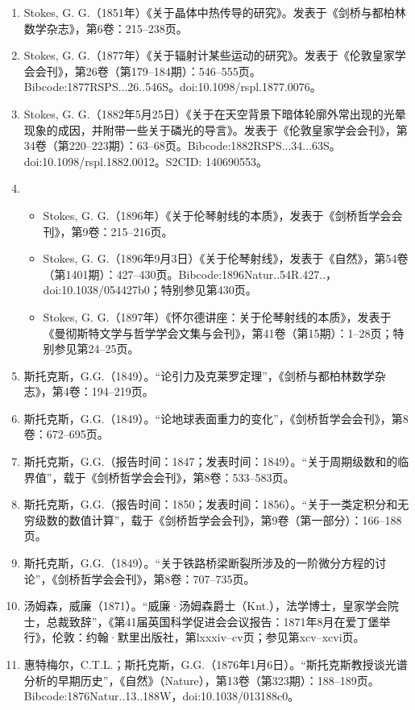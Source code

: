 \begin{enumerate}
\item Stokes, G. G.（1851年）《关于晶体中热传导的研究》。发表于《剑桥与都柏林数学杂志》，第6卷：215–238页。
\item Stokes, G. G.（1877年）《关于辐射计某些运动的研究》。发表于《伦敦皇家学会会刊》，第26卷（第179–184期）：546–555页。Bibcode:1877RSPS...26..546S。doi:10.1098/rspl.1877.0076。
\item Stokes, G. G.（1882年5月25日）《关于在天空背景下暗体轮廓外常出现的光晕现象的成因，并附带一些关于磷光的导言》。发表于《伦敦皇家学会会刊》，第34卷（第220–223期）：63–68页。Bibcode:1882RSPS...34...63S。doi:10.1098/rspl.1882.0012。S2CID: 140690553。
\item 
\begin{itemize}
\item Stokes, G. G.（1896年）《关于伦琴射线的本质》，发表于《剑桥哲学会会刊》，第9卷：215–216页。
\item Stokes, G. G.（1896年9月3日）《关于伦琴射线》，发表于《自然》，第54卷（第1401期）：427–430页。Bibcode:1896Natur..54R.427..，doi:10.1038/054427b0；特别参见第430页。
\item Stokes, G. G.（1897年）《怀尔德讲座：关于伦琴射线的本质》，发表于《曼彻斯特文学与哲学学会文集与会刊》，第41卷（第15期）：1–28页；特别参见第24–25页。
\end{itemize}
\item 斯托克斯，G.G.（1849）。“论引力及克莱罗定理”，《剑桥与都柏林数学杂志》，第4卷：194–219页。
\item 斯托克斯，G.G.（1849）。“论地球表面重力的变化”，《剑桥哲学会会刊》，第8卷：672–695页。
\item 斯托克斯，G.G.（报告时间：1847；发表时间：1849）。“关于周期级数和的临界值”，载于《剑桥哲学会会刊》，第8卷：533–583页。
\item 斯托克斯，G.G.（报告时间：1850；发表时间：1856）。“关于一类定积分和无穷级数的数值计算”，载于《剑桥哲学会会刊》，第9卷（第一部分）：166–188页。
\item 斯托克斯，G.G.（1849）。“关于铁路桥梁断裂所涉及的一阶微分方程的讨论”，《剑桥哲学会会刊》，第8卷：707–735页。
\item 汤姆森，威廉（1871）。“威廉·汤姆森爵士（Knt.），法学博士，皇家学会院士，总裁致辞”，《第41届英国科学促进会会议报告：1871年8月在爱丁堡举行》，伦敦：约翰·默里出版社，第lxxxiv–cv页；参见第xcv–xcvi页。
\item 惠特梅尔，C.T.L.；斯托克斯，G.G.（1876年1月6日）。“斯托克斯教授谈光谱分析的早期历史”，《自然》（Nature），第13卷（第323期）：188–189页。Bibcode:1876Natur..13..188W，doi:10.1038/013188c0。

\end{enumerate}
